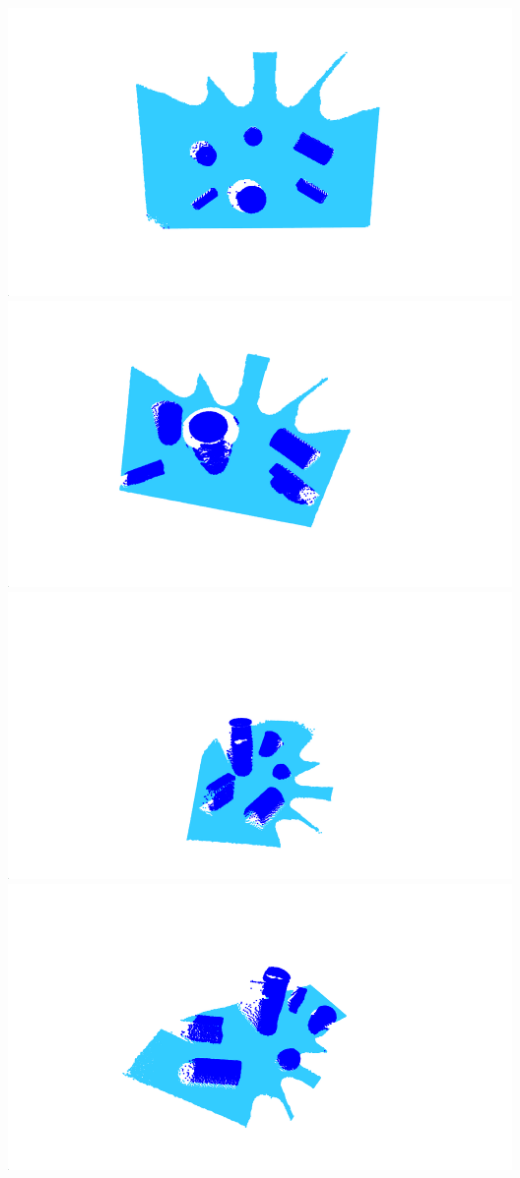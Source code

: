 \documentclass[12pt]{article}
\begin{document}
	\includegraphics[width=\linewidth]{Figure_1}
	\includegraphics[width=\linewidth]{Figure_2}
	\includegraphics[width=\linewidth]{Figure_3}
	\includegraphics[width=\linewidth]{Figure_4}
\end{document}
